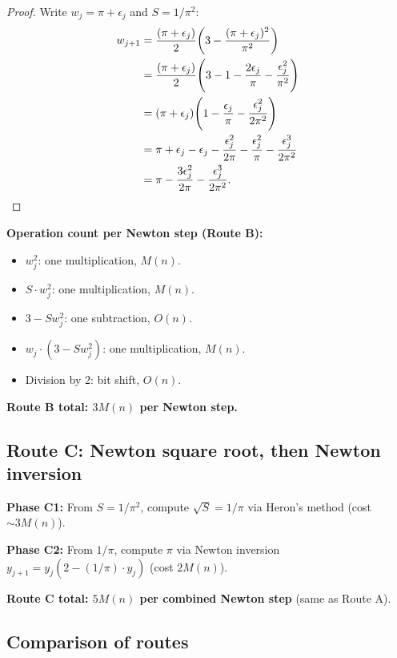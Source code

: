\documentclass[11pt]{article}
\begin{document}
\begin{proof}
Write $w_j = \pi + \epsilon_j$ and $S = 1/\pi^2$:
\begin{align*}
w_{j+1} &= \frac{(\pi + \epsilon_j)}{2}\!\left(3 - \frac{(\pi + \epsilon_j)^2}{\pi^2}\right) \\
         &= \frac{(\pi + \epsilon_j)}{2}\!\left(3 - 1 - \frac{2\epsilon_j}{\pi} - \frac{\epsilon_j^2}{\pi^2}\right) \\
         &= (\pi + \epsilon_j)\!\left(1 - \frac{\epsilon_j}{\pi} - \frac{\epsilon_j^2}{2\pi^2}\right) \\
         &= \pi + \epsilon_j - \epsilon_j - \frac{\epsilon_j^2}{2\pi} - \frac{\epsilon_j^2}{\pi} - \frac{\epsilon_j^3}{2\pi^2} \\
         &= \pi - \frac{3\epsilon_j^2}{2\pi} - \frac{\epsilon_j^3}{2\pi^2}. \qedhere
\end{align*}
\end{proof}

\noindent\textbf{Operation count per Newton step (Route B):}
\begin{itemize}
\item $w_j^2$: one multiplication, $M(n)$.
\item $S \cdot w_j^2$: one multiplication, $M(n)$.
\item $3 - S w_j^2$: one subtraction, $O(n)$.
\item $w_j \cdot (3 - Sw_j^2)$: one multiplication, $M(n)$.
\item Division by 2: bit shift, $O(n)$.
\end{itemize}
\textbf{Route B total: $3M(n)$ per Newton step.}

\subsection{Route C: Newton square root, then Newton inversion}

\noindent\textbf{Phase C1:} From $S = 1/\pi^2$, compute $\sqrt{S} = 1/\pi$ via Heron's method (cost $\sim 3M(n)$).

\noindent\textbf{Phase C2:} From $1/\pi$, compute $\pi$ via Newton inversion $y_{j+1} = y_j(2 - (1/\pi) \cdot y_j)$ (cost $2M(n)$).

\textbf{Route C total: $5M(n)$ per combined Newton step} (same as Route A).

\subsection{Comparison of routes}
\end{document}
